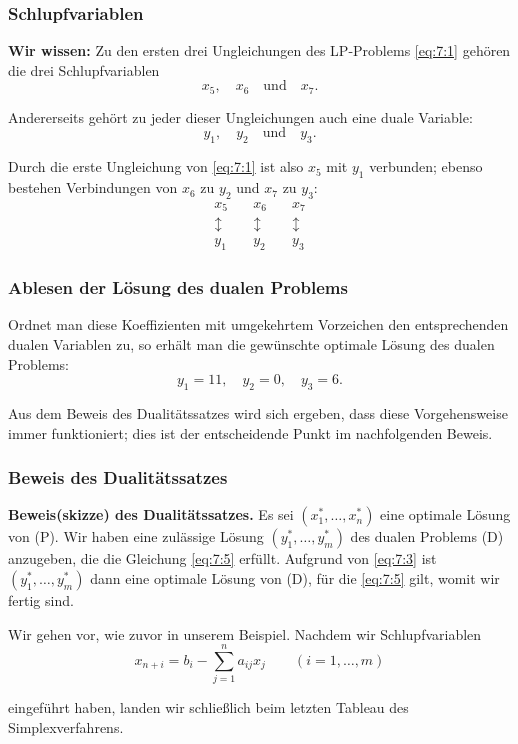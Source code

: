\documentclass[smaller]{beamer}
\begin{document}
\begin{frame}
\frametitle{Schlupfvariablen}
 \textbf{Wir wissen:} Zu den ersten drei Ungleichungen des LP-Problems \eqref{eq:7:1} gehören die drei Schlupfvariablen
\[
x_5,\quad
x_6 \quad \text{und} \quad
x_7.
\]

Andererseits gehört zu jeder dieser Ungleichungen auch eine duale Variable:
\[
y_1,\quad
y_2 \quad \text{und} \quad
y_3.
\]

Durch die erste Ungleichung von \eqref{eq:7:1} ist also $x_5$ mit $y_1$ verbunden; ebenso bestehen Verbindungen von $x_6$ zu $y_2$ und $x_7$ zu $y_3$:
\[
\begin{array}{c} x_5 \\ \updownarrow \\ y_1 \end{array} \quad
\begin{array}{c} x_6 \\ \updownarrow \\ y_2 \end{array} \quad
\begin{array}{c} x_7 \\ \updownarrow \\ y_3 \end{array}
\]
\end{frame}

\begin{frame}
\frametitle{Ablesen der Lösung des dualen Problems}
 Ordnet man diese Koeffizienten mit umgekehrtem Vorzeichen den entsprechenden dualen Variablen zu, so erhält man die gewünschte optimale Lösung des dualen Problems:
\[
y_1 = 11, \quad
y_2 = 0, \quad
y_3 = 6.
\]

\alert{Aus dem Beweis des Dualitätssatzes wird sich ergeben, dass diese Vorgehensweise immer funktioniert; dies ist der entscheidende Punkt im nachfolgenden Beweis}.
\end{frame}

\begin{frame}
\frametitle{Beweis des Dualitätssatzes}
 \textbf{Beweis(skizze) des Dualitätssatzes.} Es sei $(x_1^*, \ldots, x_n^*)$ eine optimale Lösung von (P). Wir haben eine zulässige Lösung $(y_1^*,\ldots, y_m^*)$ des dualen Problems (D) anzugeben, die die Gleichung \eqref{eq:7:5} erfüllt. Aufgrund von \eqref{eq:7:3} ist $(y_1^*, \ldots, y_m^*)$ dann eine optimale Lösung von (D), für die \eqref{eq:7:5} gilt, womit wir fertig sind. \\ \vspace*{0.2cm}

\alert{Wir gehen vor, wie zuvor in unserem Beispiel}. Nachdem wir Schlupfvariablen
\begin{equation}
\label{eq:7:6}
x_{n+i} = b_i - \sum\limits_{j=1}^{n}{a_{ij}x_j} \qquad (i=1,\ldots,m)
\end{equation}

eingeführt haben, landen wir schließlich beim letzten Tableau des Simplexverfahrens. 
\end{frame}
\end{document}
